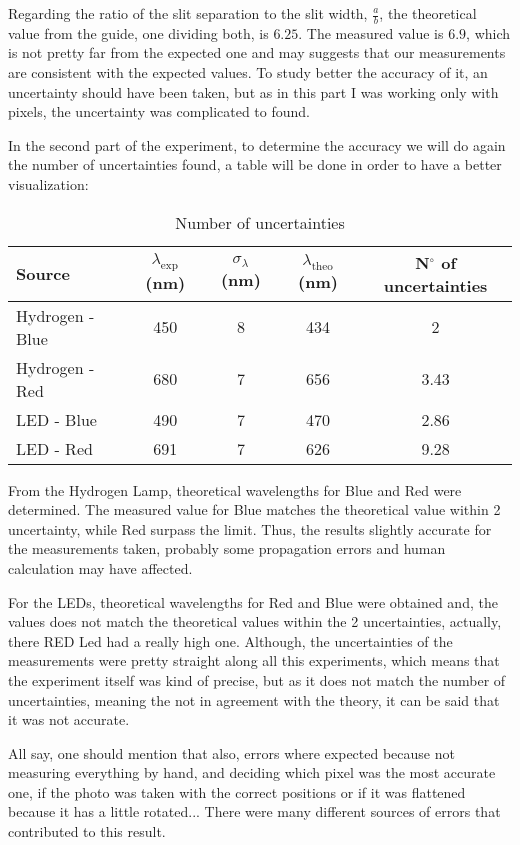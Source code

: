 Regarding the ratio of the slit separation to the slit width, $\frac{a}{b}$, the theoretical value from the guide, one dividing both, is $6.25$. The measured value is $6.9$,  which is not pretty far from the expected one and may suggests that our measurements are consistent with the expected values. To study better the accuracy of it, an uncertainty should have been taken, but as in this part I was working only with pixels, the uncertainty was complicated to found.

In the second part of the experiment, to determine the accuracy we will do again the number of uncertainties found, a table will be done in order to have a better visualization:
\begin{table}[H]
\centering
\begin{tabular}{lcccc}
\toprule
Source & $\lambda_{\text{exp}}$ (nm) & $\sigma_\lambda$ (nm) & $\lambda_{\text{theo}}$ (nm) & N$^\circ$ of uncertainties \\
\midrule
Hydrogen - Blue & 450 & 8 & 434 & 2\\
Hydrogen - Red & 680 & 7 & 656 & 3.43 \\
LED - Blue & 490 & 7 & 470 & 2.86\\
LED - Red & 691 & 7 & 626 & 9.28\\
\bottomrule
\end{tabular}
\caption{Number of uncertainties}
\end{table}

From the Hydrogen Lamp, theoretical wavelengths for Blue and Red were determined. The measured value for Blue matches the theoretical value within 2 uncertainty, while Red surpass the limit. Thus, the results slightly accurate for the measurements taken, probably some propagation errors and human calculation may have affected. 

For the LEDs, theoretical wavelengths for Red and Blue were obtained and, the values does not match the theoretical values within the 2 uncertainties, actually, there RED Led had a really high one. Although, the uncertainties of the measurements were pretty straight along all this experiments, which means that the experiment itself was kind of precise, but as it does not match the number of uncertainties, meaning the not in agreement with the theory, it can be said that it was not accurate. 

All say, one should mention that also, errors where expected because not measuring everything by hand, and deciding which pixel was the most accurate one, if the photo was taken with the correct positions or if it was flattened because it has a little rotated... There were many different sources of errors that contributed to this result.



